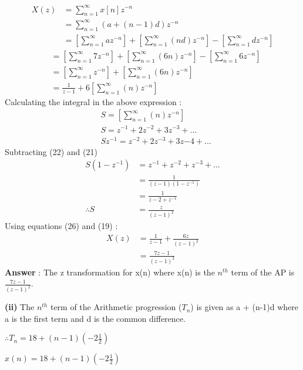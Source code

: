 \documentclass[journal,12pt,twocolumn]{IEEEtran}
\theoremstyle{remark}
\begin{document}
\begin{align}
X(z) &= \sum_{n=1}^{\infty}x[n]z^{-n}\\
 &= \sum_{n=1}^{\infty}(a+(n-1)d)z^{-n} \\
 &=  \left[\sum_{n=1}^{\infty}az^{-n} \right] + \left[ \sum_{n=1}^{\infty}(nd)z^{-n} \right] - \left[ \sum_{n=1}^{\infty}dz^{-n} \right]
 \end{align}
\begin{align}
 &=  \left[\sum_{n=1}^{\infty}7z^{-n} \right] + \left[ \sum_{n=1}^{\infty}(6n)z^{-n} \right] - \left[ \sum_{n=1}^{\infty}6z^{-n} \right]\\
 &=  \left[\sum_{n=1}^{\infty}z^{-n} \right] + \left[ \sum_{n=1}^{\infty}(6n)z^{-n} \right]\\
 &= \frac{1}{z-1} + 6\left[ \sum_{n=1}^{\infty}(n)z^{-n} \right]
\end{align}
Calculating the integral in the above expression :\\
\begin{align}
&S =  \left[\sum_{n=1}^{\infty}(n)z^{-n}\right ]\\ 
&S = z^{-1} + 2z^{-2} + 3z^{-3} + ...\\
&Sz^{-1} = z^{-2} + 2z^{-3} + 3z{-4} + ... 
\end{align}
Subtracting (22) and (21) \\
\begin{align}
S(1-z^{-1}) &= z^{-1} + z^{-2} + z^{-3} + ... \\
 &= \frac{1}{(z-1)(1-z^{-1})}\\
 &= \frac{1}{z-2+z^{-1}}\\
\therefore S &= \frac{z}{(z-1)^2}
\end{align}
Using equations (26) and (19) :\\
\begin{align}
X(z) &= \frac{1}{z-1} + \frac{6z}{(z-1)^2}\\
 &= \frac{7z-1}{(z-1)^2}
\end{align}
\large\textbf{Answer} : \normalsize The z transformation for x(n) where x(n) is the $n^{th}$ term of the AP is $\frac{7z-1}{(z-1)^2}$.
\vspace{4mm}

\textbf{(ii)} The \(n^{th}\) term of the Arithmetic progression ($T_{n}$) is given as a + (n-1)d where a is the first term and d is the common difference.

$\therefore T_{n} = 18 + (n-1)\left(-2\frac{1}{2}\right) $

$x(n) = 18 + (n-1)\left(-2\frac{1}{2}\right)$
\end{document}
